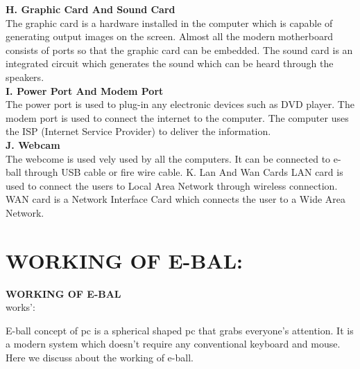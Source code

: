 \documentclass{article}
\begin{document}
   \textbf{H. Graphic Card And Sound Card}\\ 
      The graphic card is a hardware installed in the computer which is capable of generating output images on the screen. Almost all the modern motherboard consists of ports so that the graphic card can be embedded. The sound card is an integrated circuit which generates the sound which can be heard through the speakers.\\
 \textbf{I. Power Port And Modem Port}\\
  The power port is used to plug-in any electronic devices such as DVD player. The modem port is used to connect the internet to the computer. The computer uses the ISP (Internet Service Provider) to deliver the information.\\
  \textbf{ J. Webcam}\\
  The webcome is used vely used by all the computers. It can be connected to e-ball through USB cable or fire wire cable. K. Lan And Wan Cards LAN card is used to connect the users to Local Area Network through wireless connection. WAN card is a Network Interface Card which connects the user to a Wide Area Network.\\     
      
 \newpage 
 \section{WORKING OF E-BAL:}
 \textbf{WORKING OF E-BAL}\\
 works':





 E-ball concept of pc is a spherical shaped pc that grabs everyone’s attention. It is a modern system which doesn’t require any conventional keyboard and mouse. Here we discuss about the working of e-ball.\\
 
\end{document}
